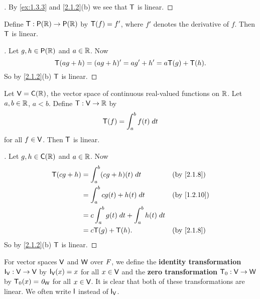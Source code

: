 \begin{proof}[]
	By \cref{ex:1.3.3} and \cref{2.1.2}(b) we see that \(\mathsf{T}\) is linear.
\end{proof}

\begin{eg}\label{2.1.7}
	Define \(\T : \ps{\R} \to \ps{\R}\) by \(\mathsf{T}(f) = f'\), where \(f'\) denotes the derivative of \(f\).
	Then \(\mathsf{T}\) is linear.
\end{eg}

\begin{proof}[]
	Let \(g, h \in \ps{\R}\) and \(a \in \mathbb{R}\).
	Now
	\[
		\mathsf{T}(ag + h) = (ag + h)' = ag' + h' = a\mathsf{T}(g) + \mathsf{T}(h).
	\]
	So by \cref{2.1.2}(b) \(\mathsf{T}\) is linear.
\end{proof}

\begin{eg}\label{2.1.8}
	Let \(\V = \cfs(\R)\), the vector space of continuous real-valued functions on \(\mathbb{R}\).
	Let \(a, b \in \mathbb{R}\), \(a < b\).
	Define \(\mathsf{T} : \mathsf{V} \to \mathbb{R}\) by
	\[
		\mathsf{T}(f) = \int_a^b f(t) \; dt
	\]
	for all \(f \in \mathsf{V}\).
	Then \(\mathsf{T}\) is linear.
\end{eg}

\begin{proof}[]
	Let \(g, h \in \cfs(\R)\) and \(a \in \mathbb{R}\).
	Now
	\begin{align*}
		\T(cg + h) & = \int_a^b (cg + h)(t) \; dt                  &  & \by{2.1.8}  \\
		           & = \int_a^b cg(t) + h(t) \; dt                 &  & \by{1.2.10} \\
		           & = c \int_a^b g(t) \; dt + \int_a^b h(t) \; dt                  \\
		           & = c \T(g) + \T(h).                            &  & \by{2.1.8}
	\end{align*}
	So by \cref{2.1.2}(b) \(\mathsf{T}\) is linear.
\end{proof}

\begin{eg}\label{2.1.9}
	For vector spaces \(\mathsf{V}\) and \(\mathsf{W}\) over \(\mathit{F}\), we define the \textbf{identity transformation} \(\IT[\V] : \V \to \V\) by \(\IT[\V](x) = x\) for all \(x \in \mathsf{V}\) and the \textbf{zero transformation} \(\mathsf{T}_0 : \mathsf{V} \to \mathsf{W}\) by \(\mathsf{T}_0(x) = \mathit{0}_{\mathsf{W}}\) for all \(x \in \mathsf{V}\).
	It is clear that both of these transformations are linear.
	We often write \(\IT\) instead of \(\IT[\V]\).
\end{eg}

